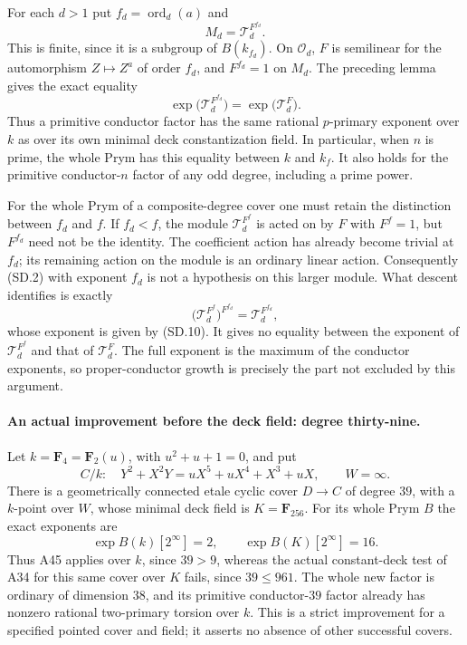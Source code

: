 For each $d>1$ put $f_d=\operatorname{ord}_d(a)$ and
\[
                      M_d=\mathscr T_d^{F^{f_d}}.
\]
This is finite, since it is a subgroup of $B(k_{f_d})$.
On $\mathcal O_d$, $F$ is semilinear for the automorphism
$Z\mapsto Z^a$ of order $f_d$, and $F^{f_d}=1$ on $M_d$.
The preceding lemma gives the exact equality
\[
       \exp\bigl(\mathscr T_d^{F^{f_d}}\bigr)
                    =\exp\bigl(\mathscr T_d^F\bigr).
 \tag{SD.10}
\]
Thus a primitive conductor factor has the same rational
$p$-primary exponent over $k$ as over its own minimal deck
constantization field.  In particular, when $n$ is prime,
the whole Prym has this equality between $k$ and $k_f$.
It also holds for the primitive conductor-$n$ factor of any
odd degree, including a prime power.

For the whole Prym of a composite-degree cover one must retain
the distinction between $f_d$ and $f$.  If $f_d<f$, the module
$\mathscr T_d^{F^f}$ is acted on by $F$ with $F^f=1$, but
$F^{f_d}$ need not be the identity.  The coefficient action
has already become trivial at $f_d$; its remaining action on
the module is an ordinary linear action.  Consequently
(SD.2) with exponent $f_d$ is not a hypothesis on this larger
module.  What descent identifies is exactly
\[
 \bigl(\mathscr T_d^{F^f}\bigr)^{F^{f_d}}
        =\mathscr T_d^{F^{f_d}},
 \tag{SD.11}
\]
whose exponent is given by (SD.10).  It gives no equality
between the exponent of $\mathscr T_d^{F^f}$ and that of
$\mathscr T_d^F$.  The full exponent is the maximum of the
conductor exponents, so proper-conductor growth is precisely
the part not excluded by this argument.


\paragraph{An actual improvement before the deck field: degree thirty-nine.}
Let $k=\mathbf F_4=\mathbf F_2(u)$, with $u^2+u+1=0$, and put
\[
 C/k:\quad Y^2+X^2Y=uX^5+uX^4+X^3+uX,
                       \qquad W=\infty.
 \tag{ND.12}
\]
There is a geometrically connected etale cyclic cover
$D\to C$ of degree $39$, with a $k$-point over $W$, whose
minimal deck field is $K=\mathbf F_{256}$. For its whole Prym
$B$ the exact exponents are
\[
       \exp B(k)[2^\infty]=2,
             \qquad \exp B(K)[2^\infty]=16.
 \tag{ND.13}
\]
Thus A45 applies over $k$, since $39>9$, whereas the actual
constant-deck test of A34 for this same cover over $K$ fails,
since $39\le961$. The whole new factor is ordinary of dimension
$38$, and its primitive conductor-$39$ factor already has
nonzero rational two-primary torsion over $k$. This is a
strict improvement for a specified pointed cover and field;
it asserts no absence of other successful covers.

